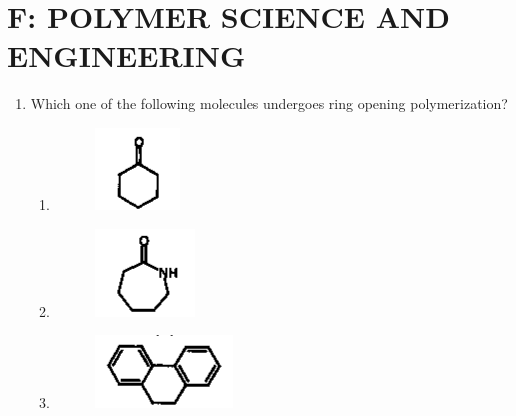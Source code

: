 \documentclass[a4paper,10pt]{article}
\begin{document}
\section*{F: POLYMER SCIENCE AND ENGINEERING}
\begin{enumerate}
\item Which one of the following molecules undergoes ring opening polymerization?
\begin{flushright}
\end{flushright}

\begin{multicols}{2}
\begin{enumerate}
\item \begin{figure}[H]
    \centering
    \includegraphics[width=0.5\columnwidth]{F1opt1.png}
    \caption*{}
    \label{fig:opt1}
\end{figure}
\item \begin{figure}[H]
    \centering
    \includegraphics[width=0.5\columnwidth]{F1opt2.png}
    \caption*{}
    \label{fig:opt2}
\end{figure}
\item \begin{figure}[H]
    \centering
    \includegraphics[width=0.5\columnwidth]{F1opt3.png}

\end{figure}
\end{enumerate}
\end{multicols}
\end{enumerate}
\end{document}
